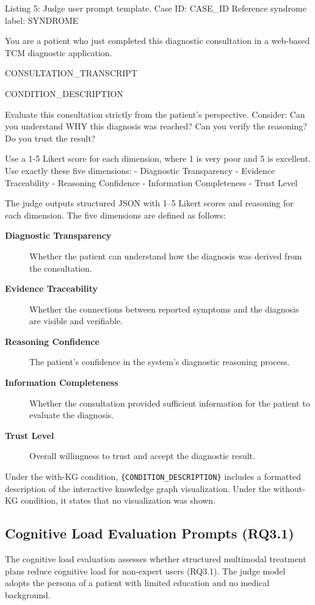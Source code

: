 \documentclass[12pt]{article}
\begin{document}
\begin{promptbox}{Listing 5: Judge user prompt template.}
Case ID: {CASE_ID}
Reference syndrome label: {SYNDROME}

You are a patient who just completed this diagnostic consultation
in a web-based TCM diagnostic application.

{CONSULTATION_TRANSCRIPT}

{CONDITION_DESCRIPTION}

Evaluate this consultation strictly from the patient's perspective.
Consider: Can you understand WHY this diagnosis was reached? Can
you verify the reasoning? Do you trust the result?

Use a 1-5 Likert score for each dimension, where 1 is very poor
and 5 is excellent. Use exactly these five dimensions:
- Diagnostic Transparency
- Evidence Traceability
- Reasoning Confidence
- Information Completeness
- Trust Level
\end{promptbox}

The judge outputs structured JSON with 1--5 Likert scores and reasoning for each dimension. The five dimensions are defined as follows:
\begin{description}
\item[\textbf{Diagnostic Transparency}] Whether the patient can understand how the diagnosis was derived from the consultation.
\item[\textbf{Evidence Traceability}] Whether the connections between reported symptoms and the diagnosis are visible and verifiable.
\item[\textbf{Reasoning Confidence}] The patient's confidence in the system's diagnostic reasoning process.
\item[\textbf{Information Completeness}] Whether the consultation provided sufficient information for the patient to evaluate the diagnosis.
\item[\textbf{Trust Level}] Overall willingness to trust and accept the diagnostic result.
\end{description}
Under the with-KG condition, \texttt{\{CONDITION\_DESCRIPTION\}} includes a formatted description of the interactive knowledge graph visualization. Under the without-KG condition, it states that no visualization was shown.

\subsection{Cognitive Load Evaluation Prompts (RQ3.1)}
The cognitive load evaluation assesses whether structured multimodal treatment plans reduce cognitive load for non-expert users (RQ3.1). The judge model adopts the persona of a patient with limited education and no medical background.
\end{document}
